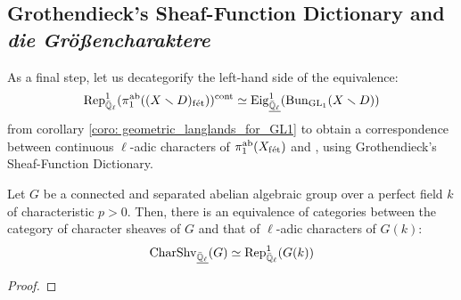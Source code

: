     \subsection{Grothendieck's Sheaf-Function Dictionary and \textit{die Gr\"o{\ss}encharaktere}}
        As a final step, let us decategorify the left-hand side of the equivalence:
            $$\mathrm{Rep}_{\bar{\mathbb{Q}}_{\ell}}^1(\pi_1^{\mathrm{ab}}((X \smallsetminus D)_{\mathrm{f\acute{e}t}}))^{\mathrm{cont}} \simeq \mathrm{Eig}_{\underline{\bar{\mathbb{Q}}_{\ell}}}^1(\mathrm{Bun}_{\operatorname{GL}_1}(X \smallsetminus D))$$
        from corollary \ref{coro: geometric_langlands_for_GL1} to obtain a correspondence between continuous $\ell$-adic characters of $\pi_1^{\mathrm{ab}}(X_{\mathrm{f\acute{e}t}})$ and , using Grothendieck's Sheaf-Function Dictionary.
        \begin{lemma} \label{lemma: character_sheav es_of_group_schemes_and_group_characters}
            Let $G$ be a connected and separated abelian algebraic group over a perfect field $k$ of characteristic $p > 0$. Then, there is an equivalence of categories between the category of character sheaves of $G$ and that of $\ell$-adic characters of $G(k)$:
                $$\mathrm{Char}\mathrm{Shv}_{\underline{\bar{\mathbb{Q}}_{\ell}}}(G) \simeq \mathrm{Rep}^1_{\bar{\mathbb{Q}}_{\ell}}(G(k))$$
        \end{lemma}
            \begin{proof}
                
            \end{proof}